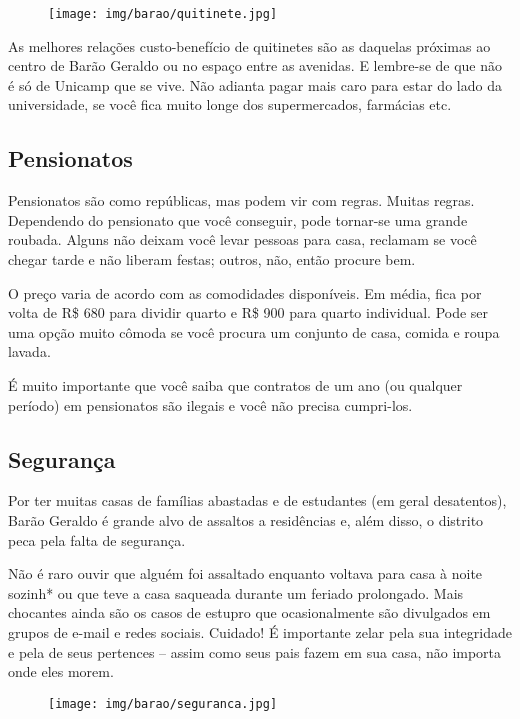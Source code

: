 \begin{figure}[h!]
    \centering
    \texttt{[image: img/barao/quitinete.jpg]}
\end{figure}

As melhores relações custo-benefício de quitinetes são as daquelas próximas ao
centro de Barão Geraldo ou no espaço entre as avenidas. E lembre-se de que não é
só de Unicamp que se vive. Não adianta pagar mais caro para estar do lado da
universidade, se você fica muito longe dos supermercados, farmácias etc.

\subsection{Pensionatos}

Pensionatos são como repúblicas, mas podem vir com regras. Muitas regras.
Dependendo do pensionato que você conseguir, pode tornar-se uma grande
roubada. Alguns não deixam você levar pessoas para casa, reclamam se você chegar
tarde e não liberam festas; outros, não, então procure bem.

O preço varia de acordo com as comodidades disponíveis. Em média, fica por volta
de R\$ 680 para dividir quarto e R\$ 900 para quarto individual. Pode ser uma
opção muito cômoda se você procura um conjunto de casa, comida e roupa lavada.

É muito importante que você saiba que contratos de um ano (ou qualquer período)
em pensionatos são ilegais e você não precisa cumpri-los.

\subsection{Segurança}

Por ter muitas casas de famílias abastadas e de estudantes (em geral
desatentos), Barão Geraldo é grande alvo de assaltos a residências e, além
disso, o distrito peca pela falta de segurança.

Não é raro ouvir que alguém foi assaltado enquanto voltava para casa à noite
sozinh* ou que teve a casa saqueada durante um feriado prolongado. Mais
chocantes ainda são os casos de estupro que ocasionalmente são
divulgados em grupos de e-mail e redes sociais. Cuidado! É importante zelar pela
sua integridade e pela de seus pertences -- assim como seus pais fazem em sua
casa, não importa onde eles morem.

\begin{figure}[h!]
    \centering
    \texttt{[image: img/barao/seguranca.jpg]}
\end{figure}

